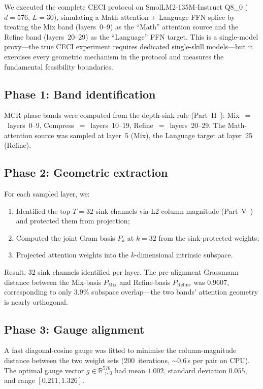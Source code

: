 \documentclass[11pt]{article}
\begin{document}
We executed the complete CECI protocol on SmolLM2-135M-Instruct Q8\_0
($d{=}576$, $L{=}30$), simulating a Math-attention + Language-FFN
splice by treating the Mix band (layers~0--9) as the ``Math'' attention
source and the Refine band (layers~20--29) as the ``Language'' FFN
target.  This is a single-model proxy---the true CECI experiment
requires dedicated single-skill models---but it exercises every
geometric mechanism in the protocol and measures the fundamental
feasibility boundaries.

\subsection{Phase 1: Band identification}

MCR phase bands were computed from the depth-sink rule
(Part~II~\cite{stewart2026gp}): Mix~$=$~layers~0--9,
Compress~$=$~layers~10--19, Refine~$=$~layers~20--29.  The
Math-attention source was sampled at layer~5 (Mix), the Language
target at layer~25 (Refine).

\subsection{Phase 2: Geometric extraction}

For each sampled layer, we:
\begin{enumerate}
\item Identified the top-$T{=}32$ sink channels via L2 column
      magnitude (Part~V~\cite{stewart2026distill}) and protected
      them from projection;
\item Computed the joint Gram basis $P_k$ at $k{=}32$ from the
      sink-protected weights;
\item Projected attention weights into the $k$-dimensional intrinsic
      subspace.
\end{enumerate}

Result.  32 sink channels identified per layer.  The
pre-alignment Grassmann distance between the Mix-basis $P_{\mathrm{Mix}}$
and Refine-basis $P_{\mathrm{Refine}}$ was $\mathbf{0.9607}$,
corresponding to only $3.9\%$ subspace overlap---the two bands'
attention geometry is nearly orthogonal.

\subsection{Phase 3: Gauge alignment}

A fast diagonal-cosine gauge was fitted to minimise the column-magnitude
distance between the two weight sets (200~iterations, ${\sim}0.6$\,s per
pair on CPU).  The optimal gauge vector $g\in\mathbb{R}^{576}_{>0}$ had
mean $1.002$, standard deviation $0.055$, and range $[0.211, 1.326]$.
\end{document}
